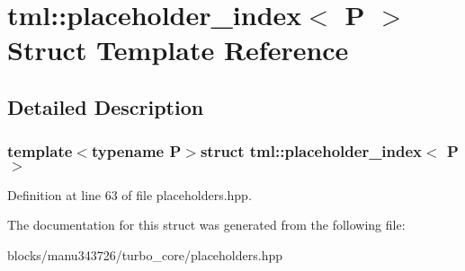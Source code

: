 \hypertarget{structtml_1_1placeholder__index}{\section{tml\+:\+:placeholder\+\_\+index$<$ P $>$ Struct Template Reference}
\label{structtml_1_1placeholder__index}
}


\subsection{Detailed Description}
\subsubsection*{template$<$typename P$>$struct tml\+::placeholder\+\_\+index$<$ P $>$}



Definition at line 63 of file placeholders.\+hpp.



The documentation for this struct was generated from the following file\+:\begin{DoxyCompactItemize}
\item 
blocks/manu343726/turbo\+\_\+core/placeholders.\+hpp\end{DoxyCompactItemize}
